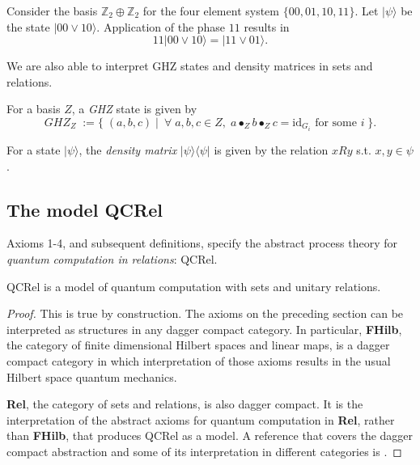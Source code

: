 \begin{example}
Consider the basis $\mathbb{Z}_2\oplus\mathbb{Z}_2$ for the four element system $\{00,01,10,11\}$.  Let $|\psi\rangle$ be the state $|00\vee10\rangle$. Application of the phase $11$ results in
\[ 11|00\vee10\rangle = |11\vee01\rangle . \]
\end{example}

We are also able to interpret GHZ states and density matrices in sets and relations.

\begin{defn}
For a basis $Z$, a \emph{GHZ} state is given by
\[ GHZ_Z \; := \{\;(a,b,c)\;|\;\ \forall \;a,b,c \in Z,\;a\bullet_Zb\bullet_Zc = \mbox{id}_{G_i}\mbox{ for some } i\;\}.  \]
\end{defn}

\begin{defn}
For a state $|\psi\rangle$, the \emph{density matrix} $|\psi\rangle\langle\psi|$ is given by the relation $xRy$ s.t. $x,y\in \psi$.
\end{defn}

\subsection{The model QCRel}

\begin{defn}
Axioms 1-4, and subsequent definitions, specify the abstract process theory for \emph{quantum computation in relations}: QCRel.
\end{defn}

\begin{theorem}
QCRel is a model of quantum computation with sets and unitary relations.
\end{theorem}
\begin{proof}
This is true by construction.  The axioms on the preceding section can be interpreted as structures in any dagger compact category. In particular, {\bf FHilb}, the category of finite dimensional Hilbert spaces and linear maps,  is a dagger compact category in which interpretation of those axioms results in the usual Hilbert space quantum mechanics.

{\bf Rel}, the category of sets and relations, is also dagger compact.  It is the interpretation of the abstract axioms for quantum computation in {\bf Rel}, rather than {\bf FHilb}, that produces QCRel as a model. A reference that covers the dagger compact abstraction and some of its interpretation in different categories is \cite{cqm-notes}.
\end{proof}

